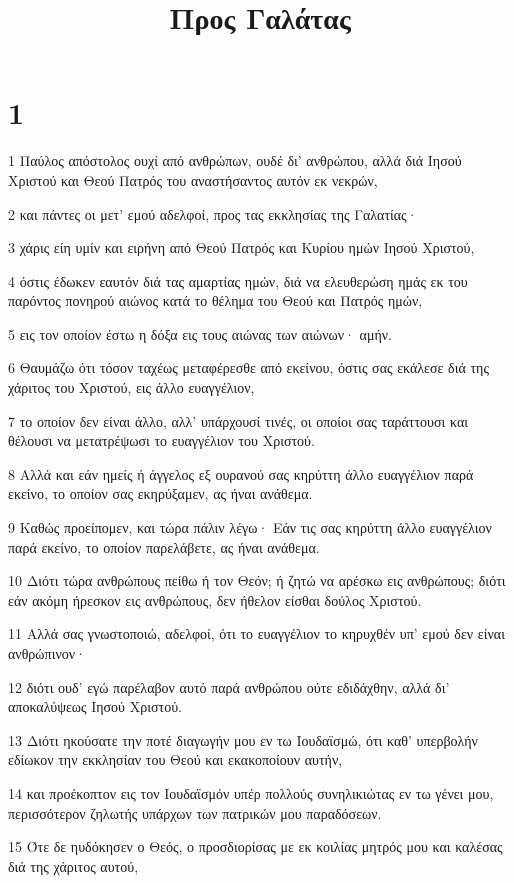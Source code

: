 

\title{Προς Γαλάτας}


\chapter{1}

\par 1 Παύλος απόστολος ουχί από ανθρώπων, ουδέ δι' ανθρώπου, αλλά διά Ιησού Χριστού και Θεού Πατρός του αναστήσαντος αυτόν εκ νεκρών,
\par 2 και πάντες οι μετ' εμού αδελφοί, προς τας εκκλησίας της Γαλατίας·
\par 3 χάρις είη υμίν και ειρήνη από Θεού Πατρός και Κυρίου ημών Ιησού Χριστού,
\par 4 όστις έδωκεν εαυτόν διά τας αμαρτίας ημών, διά να ελευθερώση ημάς εκ του παρόντος πονηρού αιώνος κατά το θέλημα του Θεού και Πατρός ημών,
\par 5 εις τον οποίον έστω η δόξα εις τους αιώνας των αιώνων· αμήν.
\par 6 Θαυμάζω ότι τόσον ταχέως μεταφέρεσθε από εκείνου, όστις σας εκάλεσε διά της χάριτος του Χριστού, εις άλλο ευαγγέλιον,
\par 7 το οποίον δεν είναι άλλο, αλλ' υπάρχουσί τινές, οι οποίοι σας ταράττουσι και θέλουσι να μετατρέψωσι το ευαγγέλιον του Χριστού.
\par 8 Αλλά και εάν ημείς ή άγγελος εξ ουρανού σας κηρύττη άλλο ευαγγέλιον παρά εκείνο, το οποίον σας εκηρύξαμεν, ας ήναι ανάθεμα.
\par 9 Καθώς προείπομεν, και τώρα πάλιν λέγω· Εάν τις σας κηρύττη άλλο ευαγγέλιον παρά εκείνο, το οποίον παρελάβετε, ας ήναι ανάθεμα.
\par 10 Διότι τώρα ανθρώπους πείθω ή τον Θεόν; ή ζητώ να αρέσκω εις ανθρώπους; διότι εάν ακόμη ήρεσκον εις ανθρώπους, δεν ήθελον είσθαι δούλος Χριστού.
\par 11 Αλλά σας γνωστοποιώ, αδελφοί, ότι το ευαγγέλιον το κηρυχθέν υπ' εμού δεν είναι ανθρώπινον·
\par 12 διότι ουδ' εγώ παρέλαβον αυτό παρά ανθρώπου ούτε εδιδάχθην, αλλά δι' αποκαλύψεως Ιησού Χριστού.
\par 13 Διότι ηκούσατε την ποτέ διαγωγήν μου εν τω Ιουδαϊσμώ, ότι καθ' υπερβολήν εδίωκον την εκκλησίαν του Θεού και εκακοποίουν αυτήν,
\par 14 και προέκοπτον εις τον Ιουδαϊσμόν υπέρ πολλούς συνηλικιώτας εν τω γένει μου, περισσότερον ζηλωτής υπάρχων των πατρικών μου παραδόσεων.
\par 15 Ότε δε ηυδόκησεν ο Θεός, ο προσδιορίσας με εκ κοιλίας μητρός μου και καλέσας διά της χάριτος αυτού,

